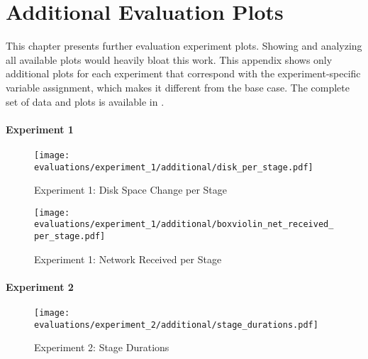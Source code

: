 \chapter{Additional Evaluation Plots}\label{appendix:evaluation_plots}

This chapter presents further evaluation experiment plots.
Showing and analyzing all available plots would heavily bloat this work.
This appendix shows only additional plots for each experiment that correspond with the experiment-specific variable assignment, which makes it different from the base case.
The complete set of data and plots is available in \cite{cli_code}.

\subsubsection{Experiment 1}

\begin{figure}[H]
    \begin{adjustwidth}{-0.2\paperwidth}{-0.2\paperwidth}
        \centering
        \texttt{[image: evaluations/experiment\_1/additional/disk\_per\_stage.pdf]}
        \caption{Experiment 1: Disk Space Change per Stage}
        \label{fig:eval_1_disk_space_per_stage}
    \end{adjustwidth}
\end{figure}

\begin{figure}[H]
    \begin{adjustwidth}{-0.2\paperwidth}{-0.2\paperwidth}
        \centering
        \texttt{[image: evaluations/experiment\_1/additional/boxviolin\_net\_received\_per\_stage.pdf]}
        \caption{Experiment 1: Network Received per Stage}
        \label{fig:eval_1_net_received}
    \end{adjustwidth}
\end{figure}

\subsubsection{Experiment 2}

\begin{figure}[H]
    \begin{adjustwidth}{-0.2\paperwidth}{-0.2\paperwidth}
        \centering
        \texttt{[image: evaluations/experiment\_2/additional/stage\_durations.pdf]}
        \caption{Experiment 2: Stage Durations}
        \label{fig:eval_2_stage_durations}
    \end{adjustwidth}
\end{figure}

